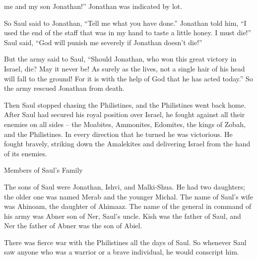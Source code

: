 {me and my son
Jonathan!” Jonathan
was indicated by lot.
\par }{\PP {}So Saul
said
to
Jonathan,
“Tell
me what
you have done.”
Jonathan
told
him, “I used the end
of the staff
that
was in my hand
to taste
a little
honey.
I
must die!”
Saul
said,
“God
will punish me severely
if
Jonathan
doesn’t die!”
\par }{\PP {}But the army
said to
Saul,
“Should Jonathan,
who won
this
great
victory in Israel,
die? May it never be! As surely
as the
{}
lives, not
a single
hair
of his head
will fall
to the ground! For
it is with
the help of God
that he has acted
today.”
So the army
rescued
Jonathan
from death.
\par }{\PP {}Then
Saul
stopped
chasing
the Philistines,
and the Philistines
went
back home.
After Saul
had secured
his royal
position over
Israel,
he fought
against all
their enemies
on all sides
– the Moabites,
Ammonites,
Edomites,
the kings
of Zobah,
and the Philistines.
In every
direction that he turned
he was victorious.
He fought bravely,
striking down
the Amalekites
and delivering
Israel
from the hand
of its enemies.
\par }{\SH Members of Saul’s Family
\par }{\PP {}The sons
of Saul
were Jonathan,
Ishvi,
and Malki-Shua.
He had two
daughters;
the older one
was named
Merab
and the younger
Michal.
The name
of Saul’s
wife
was Ahinoam,
the daughter
of Ahimaaz.
The name
of the general
in command of his army
was Abner
son
of Ner,
Saul’s
uncle.
Kish
was the father
of Saul,
and Ner
the father
of Abner
was the son
of Abiel.
\par }{\PP {}There was
fierce
war
with the Philistines
all
the days
of Saul.
So whenever Saul
saw
anyone
who was a warrior
or a brave individual,
he would conscript
him.

\par }
